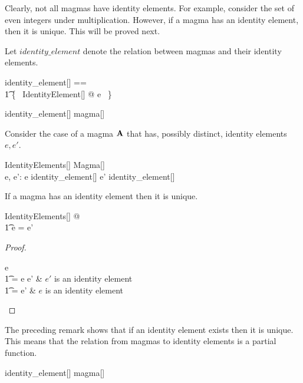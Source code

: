\documentclass{amsart}
\begin{document}
Clearly, not all magmas have identity elements.
For example, consider the set of even integers under multiplication.
However, if a magma has an identity element, then it is unique.
This will be proved next.

Let $identity\_element$ denote the relation between magmas and their identity elements.

\begin{zed}
	identity\_element[\genT] == \\
	\t1	\{~ IdentityElement[\genT] @ \strucA \mapsto e ~\}
\end{zed}

\begin{remark}

\begin{zed}
	identity\_element[\setT] \in magma[\setT] \rel \setT
\end{zed}

\end{remark}

Consider the case of a magma $\mathbf{A}$ that has, possibly distinct, identity elements $e, e'$.

\begin{schema}{IdentityElements}[\genT]
	Magma[\genT] \\
	e, e': \genT
\where
	\strucA \mapsto e \in identity\_element[\genT]
\also
	\strucA \mapsto e' \in identity\_element[\genT]
\end{schema}

\begin{remark}
If a magma has an identity element then it is unique.

\begin{zed}
	\forall IdentityElements[\setT] @ \\
	\t1	e = e'
\end{zed}

\begin{proof}
\begin{argue}
e \\
\t1	= e \opG e'	& $e'$ is an identity element \\
\t1	= e'			& $e$ is an identity element
\end{argue}
\end{proof}

\end{remark}

\begin{remark}
The preceding remark shows that if an identity element exists then it is unique.
This means that the relation from magmas to identity elements is a partial function.

\begin{zed}
identity\_element[\setT] \in magma[\setT] \pfun \setT
\end{zed}

\end{remark}
\end{document}
